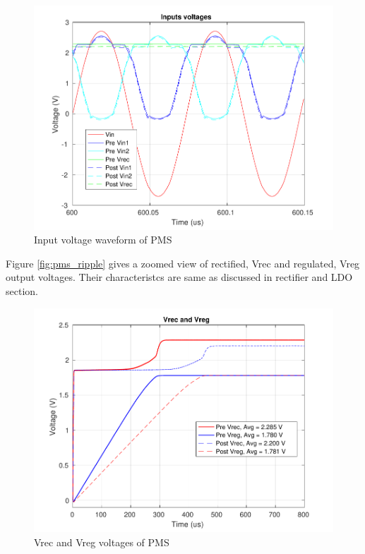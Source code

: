 \documentclass[UKenglish]{ifimaster}  %
\begin{document}
\begin{figure} [H]
  \centering
  \includegraphics[width=\textwidth]{img/pms/pms2_Vs_both.pdf} 
 \caption{Input voltage waveform of PMS} 
\label{fig:pms_vin} 
\end{figure}

Figure \ref{fig:pms_ripple} gives a zoomed view of rectified, Vrec and regulated, Vreg output voltages. Their 
characteristcs are same as discussed in rectifier and LDO section. 

\begin{figure} [H]
  \centering
  \includegraphics[width=\textwidth]{img/pms/pms2_Vout_both.pdf} 
 \caption{Vrec and Vreg voltages of PMS} 
\label{fig:pms_vout} 
\end{figure}
\end{document}
